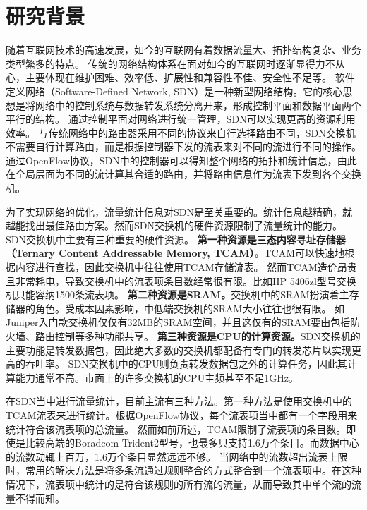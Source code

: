 \chapter{研究背景}
随着互联网技术的高速发展，如今的互联网有着数据流量大、拓扑结构复杂、业务类型繁多的特点。
传统的网络结构体系在面对如今的互联网时逐渐显得力不从心，主要体现在维护困难、效率低、扩展性和兼容性不佳、安全性不足等。
软件定义网络（Software-Defined Network, SDN）是一种新型网络结构。它的核心思想是将网络中的控制系统与数据转发系统分离开来，形成控制平面和数据平面两个平行的结构。
通过控制平面对网络进行统一管理，SDN可以实现更高的资源利用效率\cite{jain2013b4}\cite{xu2017joint}\cite{xu2018achieving}。
与传统网络中的路由器采用不同的协议来自行选择路由不同，SDN交换机不需要自行计算路由，而是根据控制器下发的流表来对不同的流进行不同的操作。
通过OpenFlow协议，SDN中的控制器可以得知整个网络的拓扑和统计信息，由此在全局层面为不同的流计算其合适的路由，并将路由信息作为流表下发到各个交换机。

为了实现网络的优化，流量统计信息对SDN是至关重要的。统计信息越精确，就越能找出最佳路由方案。然而SDN交换机的硬件资源限制了流量统计的能力。SDN交换机中主要有三种重要的硬件资源。
\textbf{第一种资源是三态内容寻址存储器（Ternary Content Addressable Memory, TCAM）。}TCAM可以快速地根据内容进行查找，因此交换机中往往使用TCAM存储流表。
然而TCAM造价昂贵且非常耗电，导致交换机中的流表项条目数经常很有限。比如HP 5406zl型号交换机只能容纳1500条流表项\cite{curtis2011devoflow}。
\textbf{第二种资源是SRAM。}交换机中的SRAM扮演着主存储器的角色。受成本因素影响，中低端交换机的SRAM大小往往也很有限。
如Juniper入门款交换机仅仅有32MB的SRAM空间\cite{ResourceMonitoring}，并且这仅有的SRAM要由包括防火墙、路由控制等多种功能共享。
\textbf{第三种资源是CPU的计算资源。}SDN交换机的主要功能是转发数据包，因此绝大多数的交换机都配备有专门的转发芯片以实现更高的吞吐率。
SDN交换机中的CPU则负责转发数据包之外的计算任务，因此其计算能力通常不高。市面上的许多交换机的CPU主频甚至不足1GHz\cite{wang2014scotch}。

在SDN当中进行流量统计，目前主流有三种方法。第一种方法是使用交换机中的TCAM流表来进行统计。根据OpenFlow协议\cite{pfaff2012openflow}，每个流表项当中都有一个字段用来统计符合该流表项的总流量。
然而如前所述，TCAM限制了流表项的条目数。即使是比较高端的Boradcom Trident2型号，也最多只支持1.6万个条目\cite{cohen2014effect}。而数据中心的流数动辄上百万\cite{kandula2009nature}，1.6万个条目显然远远不够。
当网络中的流数超出流表上限时，常用的解决方法是将多条流通过规则整合的方式整合到一个流表项中\cite{zhao2018joint}。在这种情况下，流表项中统计的是符合该规则的所有流的流量，从而导致其中单个流的流量不得而知。

